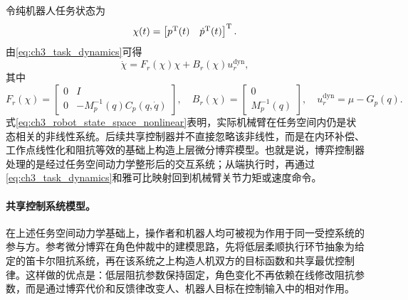 令纯机器人任务状态为
\begin{equation}
  \chi(t)=\begin{bmatrix}p^{\mathrm{T}}(t)&\dot p^{\mathrm{T}}(t)\end{bmatrix}^{\mathrm{T}} .
  \label{eq:ch3_chi_robot_state}
\end{equation}
由\eqref{eq:ch3_task_dynamics}可得
\begin{equation}
  \dot\chi=F_r(\chi)\chi+B_r(\chi)u_r^{\mathrm{dyn}},
  \label{eq:ch3_robot_state_space_nonlinear}
\end{equation}
其中
\begin{equation}
  F_r(\chi)=
  \begin{bmatrix}
    0&I\\
    0&-M_p^{-1}(q)C_p(q,\dot q)
  \end{bmatrix},
  \quad
  B_r(\chi)=
  \begin{bmatrix}
    0\\
    M_p^{-1}(q)
  \end{bmatrix},
  \quad
  u_r^{\mathrm{dyn}}=\mu-G_p(q).
  \label{eq:ch3_Fr_Br}
\end{equation}
式\eqref{eq:ch3_robot_state_space_nonlinear}表明，实际机械臂在任务空间内仍是状态相关的非线性系统。后续共享控制器并不直接忽略该非线性，而是在内环补偿、工作点线性化和阻抗等效的基础上构造上层微分博弈模型。也就是说，博弈控制器处理的是经过任务空间动力学整形后的交互系统；从端执行时，再通过\eqref{eq:ch3_task_dynamics}和雅可比映射回到机械臂关节力矩或速度命令。

\paragraph{共享控制系统模型。}
\label{subsec:ch3_impedance_game_model}

在上述任务空间动力学基础上，操作者和机器人均可被视为作用于同一受控系统的参与方。参考微分博弈在角色仲裁中的建模思路，先将低层柔顺执行环节抽象为给定的笛卡尔阻抗系统，再在该系统之上构造人机双方的目标函数和共享最优控制律\cite{franceschi2023role,franceschi2023modeling}。这样做的优点是：低层阻抗参数保持固定，角色变化不再依赖在线修改阻抗参数，而是通过博弈代价和反馈律改变人、机器人目标在控制输入中的相对作用。

